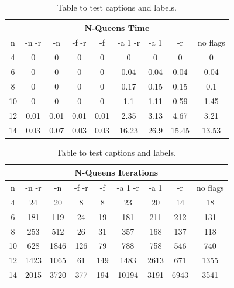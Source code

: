 \begin{table}[h!]
	\centering
	\begin{tabular}{| c | c | c | c | c | c | c | c | c |}
		\hline
		\multicolumn{9}{|c|}{N-Queens Time}                                  \\ \hline
		n  & -n -r & -n   & -f -r & -f   & -a 1 -r & -a 1 & -r    & no flags \\ \hline
		4  & 0     & 0    & 0     & 0    & 0       & 0    & 0     & 0        \\ \hline
		6  & 0     & 0    & 0     & 0    & 0.04    & 0.04 & 0.04  & 0.04     \\ \hline
		8  & 0     & 0    & 0     & 0    & 0.17    & 0.15 & 0.15  & 0.1      \\ \hline
		10 & 0     & 0    & 0     & 0    & 1.1     & 1.11 & 0.59  & 1.45     \\ \hline
		12 & 0.01  & 0.01 & 0.01  & 0.01 & 2.35    & 3.13 & 4.67  & 3.21     \\ \hline
		14 & 0.03  & 0.07 & 0.03  & 0.03 & 16.23   & 26.9 & 15.45 & 13.53    \\ \hline
	\end{tabular}
	\caption{Table to test captions and labels.}
	\label{tab:queens:time}
\end{table}

\begin{table}[h!]
	\centering
	\begin{tabular}{| c | c | c | c | c | c | c | c | c |}
		\hline
		\multicolumn{9}{|c|}{N-Queens Iterations}                          \\ \hline
		n  & -n -r & -n   & -f -r & -f  & -a 1 -r & -a 1 & -r   & no flags \\ \hline
		4  & 24    & 20   & 8     & 8   & 23      & 20   & 14   & 18       \\ \hline
		6  & 181   & 119  & 24    & 19  & 181     & 211  & 212  & 131      \\ \hline
		8  & 253   & 512  & 26    & 31  & 357     & 168  & 137  & 118      \\ \hline
		10 & 628   & 1846 & 126   & 79  & 788     & 758  & 546  & 740      \\ \hline
		12 & 1423  & 1065 & 61    & 149 & 1483    & 2613 & 671  & 1355     \\ \hline
		14 & 2015  & 3720 & 377   & 194 & 10194   & 3191 & 6943 & 3541     \\ \hline
	\end{tabular}
	\caption{Table to test captions and labels.}
	\label{tab:queens:iterations}
\end{table}

